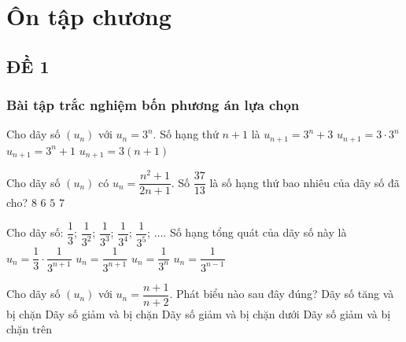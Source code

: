 \section{Ôn tập chương}
\setcounter{section}{0}
\setcounter{subsubsection}{0}
\setcounter{ex}{0}
\setcounter{bt}{0}
 
\subsection{ĐỀ 1}
\subsubsection{Bài tập trắc nghiệm bốn phương án lựa chọn}
\begin{ex}%
	Cho dãy số $(u_n)$ với $u_n=3^n$. Số hạng thứ $n+1$ là
	\choice
	{$u_{n+1}=3^n+3$}
	{\True $u_{n+1}=3\cdot 3^n$}
	{$u_{n+1}=3^n+1$}
	{$u_{n+1}=3(n+1)$}
\end{ex}
\begin{ex}%
	Cho dãy số $(u_n)$ có $u_n=\dfrac{n^2+1}{2n+1}$. Số $\dfrac{37}{13}$ là số hạng thứ bao nhiêu của dãy số đã cho?
	\choice
	{$8$}
	{\True $6$}
	{$5$}
	{$7$}
\end{ex}
\begin{ex}%
	Cho dãy số: $\dfrac{1}{3}$; $\dfrac{1}{3^2}$; $\dfrac{1}{3^3}$; $\dfrac{1}{3^4}$; $\dfrac{1}{3^5}$; $\ldots$. Số hạng tổng quát của dãy số này là
	\choice
	{$u_n=\dfrac{1}{3}\cdot \dfrac{1}{3^{n+1}}$}
	{$u_n=\dfrac{1}{3^{n+1}}$}
	{\True $u_n=\dfrac{1}{3^n}$}
	{$u_n=\dfrac{1}{3^{n-1}}$}
\end{ex}
\begin{ex}%
	Cho dãy số $(u_n)$ với $u_n=\dfrac{n+1}{n+2}$. Phát biểu nào sau đây đúng?
	\choice
	{\True Dãy số tăng và bị chặn}
	{Dãy số giảm và bị chặn}
	{Dãy số giảm và bị chặn dưới}
	{Dãy số giảm và bị chặn trên}
\end{ex}
